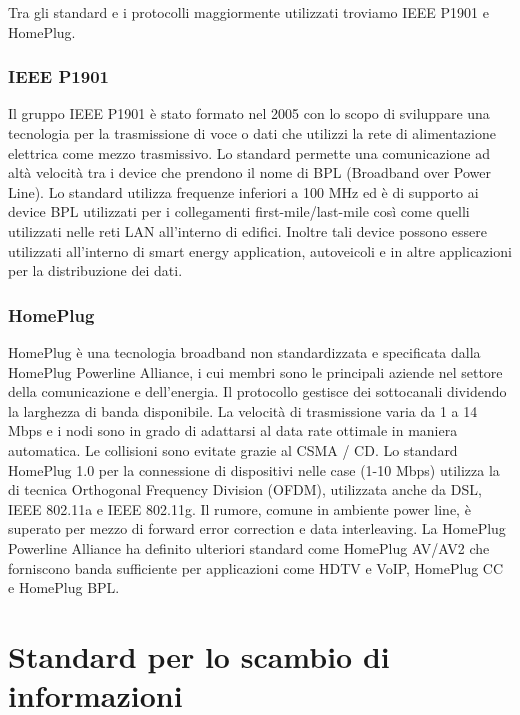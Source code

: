 Tra gli standard e i protocolli maggiormente utilizzati troviamo IEEE P1901 e HomePlug.
\newpage
\subsubsection{IEEE P1901}
Il gruppo IEEE P1901 è stato formato nel 2005 con lo scopo di sviluppare una tecnologia per la trasmissione di voce o dati che utilizzi la rete di alimentazione elettrica come mezzo trasmissivo. Lo standard permette una comunicazione ad altà velocità tra i device che prendono il nome di BPL (Broadband over Power Line). Lo standard utilizza frequenze inferiori a 100 MHz ed è di supporto ai device BPL utilizzati per i collegamenti first-mile/last-mile così come quelli utilizzati nelle reti LAN all'interno di edifici. Inoltre tali device possono essere utilizzati all'interno di smart energy application, autoveicoli e in altre applicazioni per la distribuzione dei dati.
\subsubsection{HomePlug}
HomePlug è una tecnologia broadband non standardizzata e specificata dalla HomePlug Powerline Alliance, i cui membri sono le principali aziende nel settore della comunicazione e dell'energia. Il protocollo gestisce dei sottocanali dividendo la larghezza di banda disponibile. La velocità di trasmissione varia da 1 a 14 Mbps e i nodi sono in grado di adattarsi al data rate ottimale in maniera automatica. Le collisioni sono evitate grazie al CSMA / CD. Lo standard HomePlug 1.0 per la connessione di dispositivi nelle case (1-10 Mbps) utilizza la di tecnica Orthogonal Frequency Division (OFDM), utilizzata anche da DSL, IEEE 802.11a e IEEE 802.11g. Il rumore, comune in ambiente power line, è superato per mezzo di forward error correction e data interleaving. La HomePlug Powerline Alliance ha definito ulteriori standard come HomePlug AV/AV2 che forniscono banda sufficiente per applicazioni come HDTV e VoIP, HomePlug CC e HomePlug BPL.
\section{Standard per lo scambio di informazioni}
